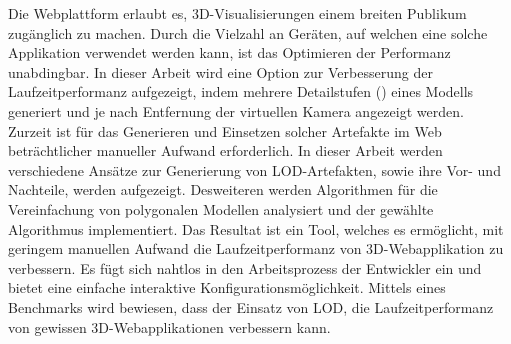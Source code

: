 Die Webplattform erlaubt es, 3D-Visualisierungen einem breiten Publikum zugänglich zu machen. Durch die Vielzahl an Geräten, auf welchen eine solche Applikation verwendet werden kann, ist das Optimieren der Performanz unabdingbar. In dieser Arbeit wird eine Option zur Verbesserung der Laufzeitperformanz aufgezeigt, indem mehrere Detailstufen () eines Modells generiert und je nach Entfernung der virtuellen Kamera angezeigt werden. Zurzeit ist für das Generieren und Einsetzen solcher Artefakte im Web beträchtlicher manueller Aufwand erforderlich.
\bigbreak
In dieser Arbeit werden verschiedene Ansätze zur Generierung von LOD-Artefakten, sowie ihre Vor- und Nachteile, werden aufgezeigt.
Desweiteren werden Algorithmen für die Vereinfachung von polygonalen Modellen analysiert und der gewählte Algorithmus implementiert.
\bigbreak
Das Resultat ist ein Tool, welches es ermöglicht, mit geringem manuellen Aufwand die Laufzeitperformanz von 3D-Webapplikation zu verbessern.
Es fügt sich nahtlos in den Arbeitsprozess der Entwickler ein und bietet eine einfache interaktive Konfigurationsmöglichkeit.
Mittels eines Benchmarks wird bewiesen, dass der Einsatz von LOD, die Laufzeitperformanz von gewissen 3D-Webapplikationen verbessern kann.
